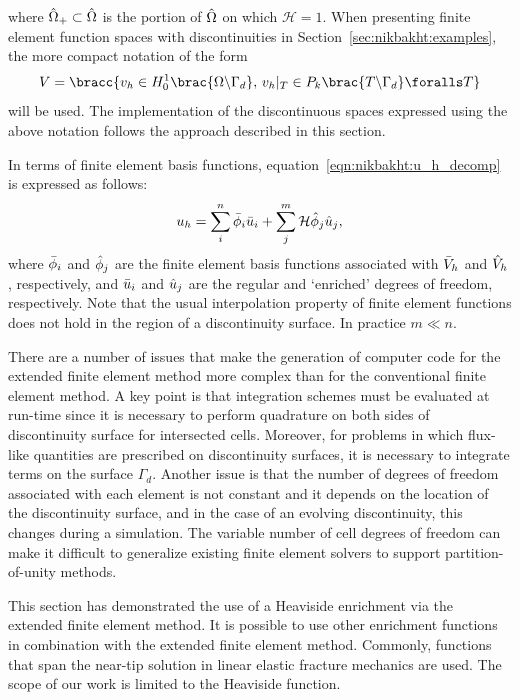 %
where $\Hat{\Omega}_{+} \subset \Hat{\Omega}$ is the portion of
$\Hat{\Omega}$ on which $\mathcal{H} = 1$.
When presenting finite element function spaces
with discontinuities in Section~\ref{sec:nikbakht:examples}, the more compact
notation of the form
%
\begin{equation}
  V = \bracc{v_{h} \in H_{0}^{1}\brac{\Omega \backslash \Gamma_{d}}, \,
          v_{h}|_{T} \in P_{k}\brac{T \backslash \Gamma_{d}} \foralls T}
\end{equation}
%
will be used. The implementation of the discontinuous spaces expressed
using the above notation follows the approach described in this section.

In terms of finite element basis functions,
equation~\eqref{eqn:nikbakht:u_h_decomp} is expressed as follows:
%
\begin{equation}
  u_{h} = \sum_{i}^{n} \Bar{\phi}_{i} \Bar{u}_{i}
    + \sum_{j}^{m} \mathcal{H} \Hat{\phi}_{j} \Hat{u}_{j},
\label{eqn:nikbakht:basis_decomp}
\end{equation}
%
where $\Bar{\phi}_{i}$ and $\Hat{\phi}_{j}$ are the finite element basis
functions associated with $\Bar{V}_{h}$ and $\Hat{V}_{h}$, respectively,
and $\Bar{u}_{i}$ and $\Hat{u}_{j}$ are the regular and `enriched' degrees
of freedom, respectively. Note that the usual interpolation property
of finite element functions does not hold in the region of a discontinuity
surface. In practice $m \ll n$.

There are a number of issues that make the generation of computer
code for the extended finite element method more complex than for the
conventional finite element method.  A key point is that integration
schemes must be evaluated at run-time since it is necessary to perform
quadrature on both sides of discontinuity surface for intersected cells.
Moreover, for problems in which flux-like quantities are prescribed
on discontinuity surfaces, it is necessary to integrate terms on the
surface $\Gamma_{d}$.  Another issue is that the number of degrees of
freedom associated with each element is not constant and it depends on
the location of the discontinuity surface, and in the case of an evolving
discontinuity, this changes during a simulation.  The variable number
of cell degrees of freedom can make it difficult to generalize existing
finite element solvers to support partition-of-unity methods.

This section has demonstrated the use of a Heaviside enrichment via the
extended finite element method. It is possible to use other enrichment
functions in combination with the extended finite element method.
Commonly, functions that span the near-tip solution in linear elastic
fracture mechanics are used.  The scope of our work is limited to the
Heaviside function.

